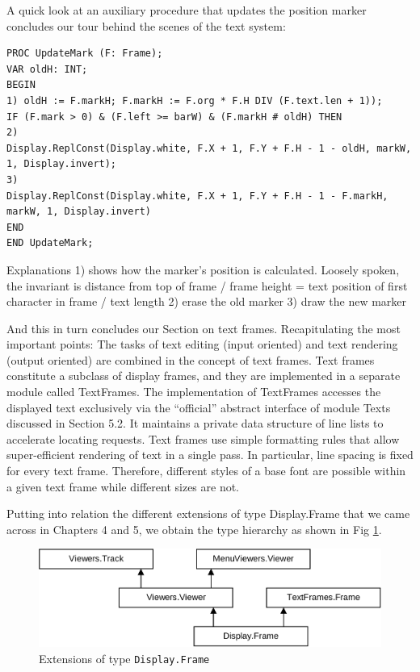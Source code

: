 A quick look at an auxiliary procedure that updates the position marker concludes our tour behind
the scenes of the text system:
\begin{verbatim}
PROC UpdateMark (F: Frame);
VAR oldH: INT;
BEGIN
1) oldH := F.markH; F.markH := F.org * F.H DIV (F.text.len + 1));
IF (F.mark > 0) & (F.left >= barW) & (F.markH # oldH) THEN
2)
Display.ReplConst(Display.white, F.X + 1, F.Y + F.H - 1 - oldH, markW, 1, Display.invert);
3)
Display.ReplConst(Display.white, F.X + 1, F.Y + F.H - 1 - F.markH, markW, 1, Display.invert)
END
END UpdateMark;
\end{verbatim}

Explanations
1) shows how the marker's position is calculated. Loosely spoken, the invariant is
distance from top of frame / frame height = text position of first character in frame / text length
2) erase the old marker
3) draw the new marker

And this in turn concludes our Section on text frames. Recapitulating the most important points: The
tasks of text editing (input oriented) and text rendering (output oriented) are combined in the
concept of text frames. Text frames constitute a subclass of display frames, and they are
implemented in a separate module called TextFrames. The implementation of TextFrames
accesses the displayed text exclusively via the “official” abstract interface of module Texts
discussed in Section 5.2. It maintains a private data structure of line lists to accelerate locating
requests. Text frames use simple formatting rules that allow super-efficient rendering of text in a
single pass. In particular, line spacing is fixed for every text frame. Therefore, different styles of a
base font are possible within a given text frame while different sizes are not.

Putting into relation the different extensions of type Display.Frame that we came across in Chapters
4 and 5, we obtain the type hierarchy as shown in Fig \ref{fig:extensions}.
\begin{figure}
  \label{fig:extensions}
  \centering
  \includegraphics[width=\textwidth]{i/h}
  \caption{Extensions of type \verb|Display.Frame|}
\end{figure}



